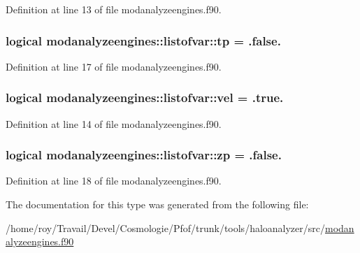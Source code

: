 Definition at line 13 of file modanalyzeengines.\+f90.

\subsubsection[{\texorpdfstring{tp}{tp}}]{\setlength{\rightskip}{0pt plus 5cm}logical modanalyzeengines\+::listofvar\+::tp = .false.}\hypertarget{structmodanalyzeengines_1_1listofvar_a104540030e3f4d3e94baa7bb7fb646bb}{}\label{structmodanalyzeengines_1_1listofvar_a104540030e3f4d3e94baa7bb7fb646bb}


Definition at line 17 of file modanalyzeengines.\+f90.

\subsubsection[{\texorpdfstring{vel}{vel}}]{\setlength{\rightskip}{0pt plus 5cm}logical modanalyzeengines\+::listofvar\+::vel = .true.}\hypertarget{structmodanalyzeengines_1_1listofvar_acaf2325a18057a558ecc040799333e38}{}\label{structmodanalyzeengines_1_1listofvar_acaf2325a18057a558ecc040799333e38}


Definition at line 14 of file modanalyzeengines.\+f90.

\subsubsection[{\texorpdfstring{zp}{zp}}]{\setlength{\rightskip}{0pt plus 5cm}logical modanalyzeengines\+::listofvar\+::zp = .false.}\hypertarget{structmodanalyzeengines_1_1listofvar_ae456c347d77781a9ea6efcfe2887f710}{}\label{structmodanalyzeengines_1_1listofvar_ae456c347d77781a9ea6efcfe2887f710}


Definition at line 18 of file modanalyzeengines.\+f90.



The documentation for this type was generated from the following file\+:\begin{DoxyCompactItemize}
\item 
/home/roy/\+Travail/\+Devel/\+Cosmologie/\+Pfof/trunk/tools/haloanalyzer/src/\hyperlink{modanalyzeengines_8f90}{modanalyzeengines.\+f90}\end{DoxyCompactItemize}
